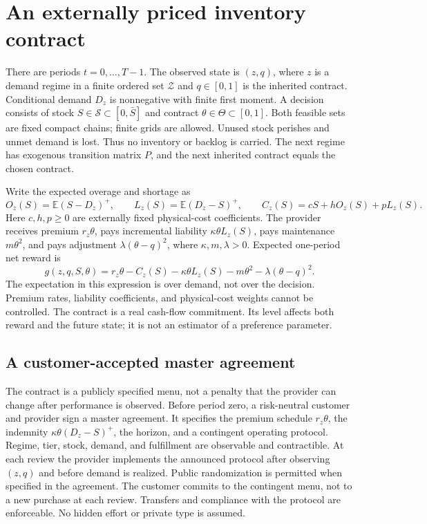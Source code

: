 \documentclass[11pt,letterpaper]{article}
\theoremstyle{definition}
\newcommand{\E}{\mathbb E}
\newcommand{\1}{\mathbf 1}
\newcommand{\pos}[1]{(#1)^+}
\begin{document}
\section{An externally priced inventory contract}\label{sec:model}
There are periods $t=0,\ldots,T-1$. The observed state is $(z,q)$, where $z$ is a demand regime in a finite ordered set $\mathcal Z$ and $q\in[0,1]$ is the inherited contract. Conditional demand $D_z$ is nonnegative with finite first moment. A decision consists of stock $S\in\mathcal S\subset[0,\bar S]$ and contract $\theta\in\Theta\subset[0,1]$. Both feasible sets are fixed compact chains; finite grids are allowed. Unused stock perishes and unmet demand is lost. Thus no inventory or backlog is carried. The next regime has exogenous transition matrix $P$, and the next inherited contract equals the chosen contract.

Write the expected overage and shortage as
\begin{equation}\label{eq:cost}
 O_z(S)=\E\pos{S-D_z},\qquad L_z(S)=\E\pos{D_z-S},\qquad
 C_z(S)=cS+hO_z(S)+pL_z(S).
\end{equation}
Here $c,h,p\geq0$ are externally fixed physical-cost coefficients. The provider receives premium $r_z\theta$, pays incremental liability $\kappa\theta L_z(S)$, pays maintenance $m\theta^2$, and pays adjustment $\lambda(\theta-q)^2$, where $\kappa,m,\lambda>0$. Expected one-period net reward is
\begin{equation}\label{eq:reward}
 g(z,q,S,\theta)=r_z\theta-C_z(S)-\kappa\theta L_z(S)
                       -m\theta^2-\lambda(\theta-q)^2.
\end{equation}
The expectation in this expression is over demand, not over the decision. Premium rates, liability coefficients, and physical-cost weights cannot be controlled. The contract is a real cash-flow commitment. Its level affects both reward and the future state; it is not an estimator of a preference parameter.

\subsection{A customer-accepted master agreement}\label{sec:institution}
The contract is a publicly specified menu, not a penalty that the provider can change after performance is observed. Before period zero, a risk-neutral customer and provider sign a master agreement. It specifies the premium schedule $r_z\theta$, the indemnity $\kappa\theta(D_z-S)^+$, the horizon, and a contingent operating protocol. Regime, tier, stock, demand, and fulfillment are observable and contractible. At each review the provider implements the announced protocol after observing $(z,q)$ and before demand is realized. Public randomization is permitted when specified in the agreement. The customer commits to the contingent menu, not to a new purchase at each review. Transfers and compliance with the protocol are enforceable. No hidden effort or private type is assumed.
\end{document}
